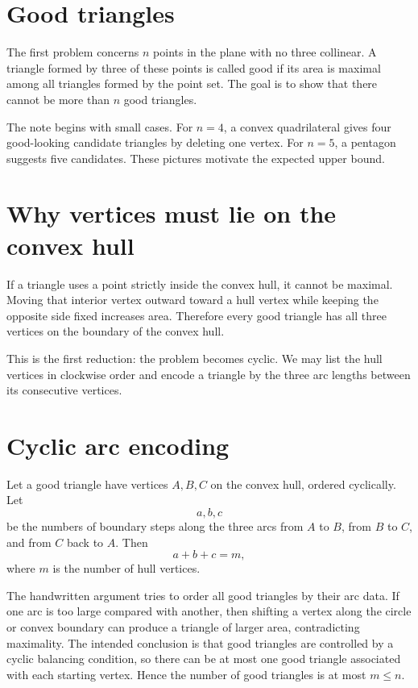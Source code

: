 
\section{Good triangles}

The first problem concerns $n$ points in the plane with no three collinear.  A triangle formed by three of these points is called good if its area is maximal among all triangles formed by the point set.  The goal is to show that there cannot be more than $n$ good triangles.

The note begins with small cases.  For $n=4$, a convex quadrilateral gives four good-looking candidate triangles by deleting one vertex.  For $n=5$, a pentagon suggests five candidates.  These pictures motivate the expected upper bound.

\section{Why vertices must lie on the convex hull}

If a triangle uses a point strictly inside the convex hull, it cannot be maximal.  Moving that interior vertex outward toward a hull vertex while keeping the opposite side fixed increases area.  Therefore every good triangle has all three vertices on the boundary of the convex hull.

This is the first reduction: the problem becomes cyclic.  We may list the hull vertices in clockwise order and encode a triangle by the three arc lengths between its consecutive vertices.

\section{Cyclic arc encoding}

Let a good triangle have vertices $A,B,C$ on the convex hull, ordered cyclically.  Let
\[
  a,b,c
\]
be the numbers of boundary steps along the three arcs from $A$ to $B$, from $B$ to $C$, and from $C$ back to $A$.  Then
\[
  a+b+c=m,
\]
where $m$ is the number of hull vertices.

The handwritten argument tries to order all good triangles by their arc data.  If one arc is too large compared with another, then shifting a vertex along the circle or convex boundary can produce a triangle of larger area, contradicting maximality.  The intended conclusion is that good triangles are controlled by a cyclic balancing condition, so there can be at most one good triangle associated with each starting vertex.  Hence the number of good triangles is at most $m\le n$.

